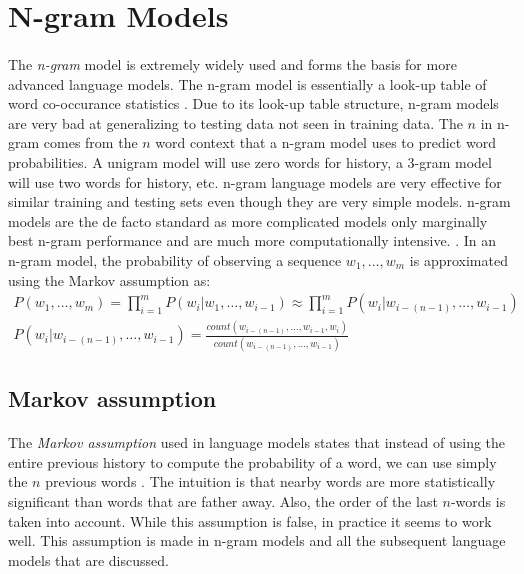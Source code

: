 \section{N-gram Models}
\paragraph{}
The \emph{n-gram} model is extremely widely used and forms the basis for more advanced language models. The n-gram model is essentially a look-up table of word co-occurance statistics \cite{Jurafsky2009}. Due to its look-up table structure, n-gram models are very bad at generalizing to testing data not seen in training data. The $n$ in n-gram comes from the $n$ word context that a n-gram model uses to predict word probabilities. A unigram model will use zero words for history, a 3-gram model will use two words for history, etc. n-gram language models are very effective for similar training and testing sets even though they are very simple models. n-gram models are the de facto standard as more complicated models only marginally best n-gram performance and are much more computationally intensive. \cite{Mikolov2012}. 
In an n-gram model, the probability of observing a sequence $w_1, \dots, w_m$ is approximated using the Markov assumption as:
\begin{align}
P(w_1,\dots,w_m) = \prod^{m}_{i=1} P(w_i|w_1,\dots, w_{i-1}) \approx  \prod^{m}_{i=1} P(w_i | w_{i-(n-1)},\dots, w_{i-1}) 
\\P(w_i | w_{i-(n-1)},\dots, w_{i-1}) = \frac{count(w_{i-(n-1)},\dots,w_{i-1},w_i)}{count(w_{i-(n-1)},\dots,w_{i-1})}
\end{align}
\subsection{Markov assumption}
\paragraph{}
The \emph{Markov assumption} used in language models states that instead of using the entire previous history to compute the probability of a word, we can use simply the $n$ previous words \cite{Jurafsky2009}. The intuition is that nearby words are more statistically significant than words that are father away. Also, the order of the last $n$-words is taken into account. While this assumption is false, in practice it seems to work well. This assumption is made in n-gram models and all the subsequent language models that are discussed.
